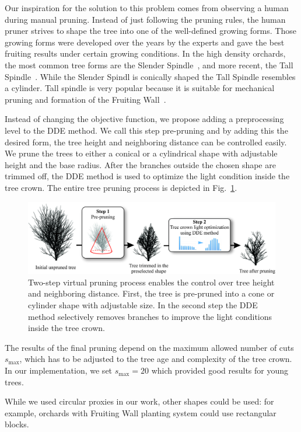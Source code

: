 Our inspiration for the solution to this problem comes from observing a
human during manual pruning. Instead of just following the pruning
rules, the human pruner strives to shape the tree into one of the
well-defined growing forms. Those growing forms were developed over the
years by the experts and gave the best fruiting results under certain
growing conditions. In the high density orchards, the most common tree
forms are the Slender Spindle~\cite{weber_optimizing_2000}, and more recent, the Tall
Spindle~\cite{robinson_vision_2013}. While the Slender Spindl is conically shaped
the Tall Spindle resembles a cylinder. Tall spindle is very popular because it
is suitable for mechanical pruning and formation of the Fruiting Wall~\cite{robinson_vision_2013}.

Instead of changing the objective function, we propose adding a
preprocessing level to the DDE method. We call this step pre-pruning  and
by adding this the desired form, the tree height and neighboring
distance can be controlled easily. We prune the trees to either a conical or a cylindrical shape
with adjustable height and the base radius. After
the branches outside the chosen shape are trimmed off, the DDE method is
used to optimize the light condition inside the tree crown. The entire
tree pruning process is depicted in Fig.~\ref{fig:my_figure3}.
\begin{figure}[hbt]
    \centering
    \includegraphics[width=5.3in]{figs/image3.jpeg}
    \caption{Two-step virtual pruning process enables the control
over tree height and neighboring distance. First, the tree is pre-pruned
into a cone or cylinder shape with adjustable size. In the second step
the DDE method selectively removes branches to improve the light
conditions inside the tree crown.}
    \label{fig:my_figure3}
\end{figure}

The results of the final pruning depend on the maximum
allowed number of cuts \(s_{\mathrm{\max}}\), which has to be adjusted
to the tree age and complexity of the tree crown. In our implementation,
we set \(s_{\mathrm{\max}} = 20\) which provided good results for young
trees. 

While we used circular proxies in our work, other shapes could be
used: for example, orchards with Fruiting Wall planting system could use
rectangular blocks.
